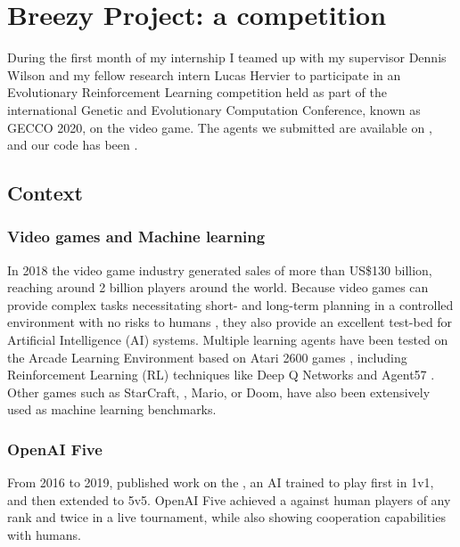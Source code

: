 \chapter{Breezy Project: a \dota competition}
\label{chap:dota}

During the first month of my internship I teamed up with my supervisor Dennis Wilson and my fellow research intern Lucas Hervier to participate in an Evolutionary Reinforcement Learning competition held as part of the international Genetic and Evolutionary Computation Conference, known as GECCO 2020, on the \dota video game. The agents we submitted are available on , and our code has been .

\section{Context}
\subsection{Video games and Machine learning}
In 2018 the video game industry generated sales of more than US\$130 billion, reaching around 2 billion players around the world. Because video games can provide complex tasks necessitating short- and long-term planning in a controlled environment with no risks to humans \cite{Games_AI}, they also provide an excellent test-bed for Artificial Intelligence (AI) systems. Multiple learning agents have been tested on the Arcade Learning Environment based on Atari 2600 games \cite{Atari}, including Reinforcement Learning (RL) techniques like Deep Q Networks \cite{DQN} and Agent57 \cite{agent57}. Other games such as StarCraft, \dota, Mario, or Doom, have also been extensively used as machine learning benchmarks.


\subsection{OpenAI Five}
From 2016 to 2019,  published work on the , an AI trained to play \dota first in 1v1, and then extended to 5v5. OpenAI Five achieved a  against human players of any rank and  twice in a live tournament, while also showing cooperation capabilities with humans. 

